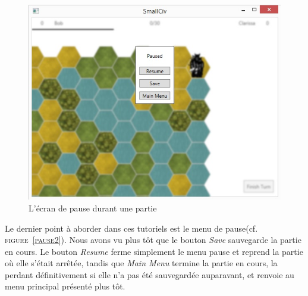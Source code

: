 \begin{figure}[h]
	\centering
	\includegraphics{img/pause.jpg}
	\caption{L'écran de pause durant une partie}
	\label{poause2}
\end{figure}
Le dernier point à aborder dans ces tutoriels est le menu de pause(cf. \textsc{figure~\ref{pause2}}). Nous avons vu plus tôt que le bouton \emph{Save} sauvegarde la partie en cours. Le bouton \emph{Resume} ferme simplement le menu pause et reprend la partie où elle s'était arrêtée, tandis que \emph{Main Menu} termine la partie en cours, la perdant définitivement si elle n'a pas été sauvegardée auparavant, et renvoie au menu principal présenté plus tôt.